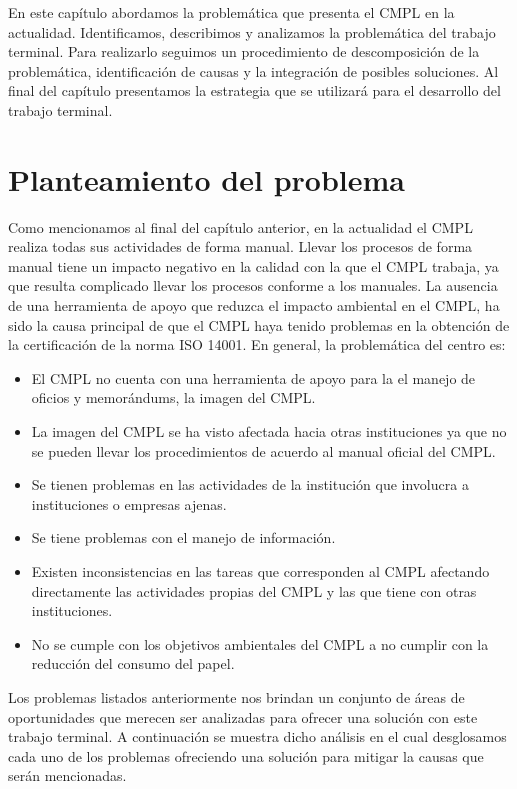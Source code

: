 En este capítulo abordamos la problemática que presenta el CMPL en la actualidad. Identificamos, describimos y analizamos la problemática del trabajo terminal. Para realizarlo seguimos un procedimiento de descomposición de la problemática, identificación de causas y la integración de posibles soluciones. Al final del capítulo presentamos la estrategia que se utilizará para el desarrollo del trabajo terminal. 
\section{Planteamiento del problema}
Como mencionamos al final del capítulo anterior, en la actualidad el CMPL realiza todas sus actividades de forma manual. Llevar los procesos de forma manual tiene un impacto negativo en la calidad con la que el CMPL trabaja, ya que resulta complicado llevar los procesos conforme a los manuales. La ausencia de una herramienta de apoyo que reduzca el impacto ambiental en el CMPL, ha sido la causa principal de que el CMPL haya tenido problemas en la obtención de la certificación de la norma ISO 14001. En general, la problemática del centro es:\\
\begin{itemize}
	\item El CMPL no cuenta con una herramienta de apoyo para la el manejo de oficios y memorándums, la imagen del CMPL.
	\item La imagen del CMPL se ha visto afectada hacia otras instituciones ya que no se pueden llevar los procedimientos de acuerdo al manual oficial del CMPL.
	\item Se tienen problemas en las actividades de la institución que involucra a instituciones o empresas ajenas.
	\item Se tiene problemas con el manejo de información.
	\item Existen inconsistencias en las tareas que corresponden al CMPL afectando directamente las actividades propias del CMPL y las que tiene con otras instituciones.
	\item No se cumple con los objetivos ambientales del CMPL a no cumplir con la reducción del consumo del papel.
\end{itemize}

Los problemas listados anteriormente nos brindan un conjunto de áreas de oportunidades que merecen ser analizadas para ofrecer una solución con este trabajo terminal. A continuación se muestra dicho análisis en el cual desglosamos cada uno de los problemas ofreciendo una solución para mitigar la causas que serán mencionadas.

